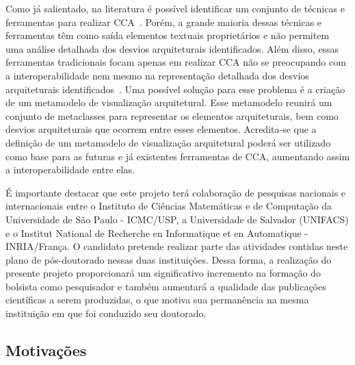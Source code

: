 \documentclass[12pt]{article}
\begin{document}
Como já salientado, na literatura é possível identificar um conjunto de técnicas e ferramentas para realizar CCA~\cite{Maffort_2013, Knodel_2007, ArchJava_2202, Murphy_1995}. Porém, a grande maioria dessas técnicas e ferramentas têm como saída elementos textuais proprietários e não permitem uma análise detalhada dos desvios arquiteturais identificados. Além disso, essas ferramentas tradicionais focam apenas em realizar CCA não se preocupando com a interoperabilidade nem mesmo na representação detalhada dos desvios arquiteturais identificados~\cite{Diehl_2007, Gallagher_2008}. Uma possível solução para esse problema é a criação de um metamodelo de visualização arquitetural. Esse metamodelo reunirá um conjunto de metaclasses para representar os elementos arquiteturais, bem como desvios arquiteturais que ocorrem entre esses elementos. Acredita-se que a definição de um metamodelo de visualização arquitetural poderá ser utilizado como base para as futuras e já existentes ferramentas de CCA, aumentando assim a interoperabilidade entre elas. 

É importante destacar que este projeto terá colaboração de pesquisas nacionais e internacionais entre o Instituto de Ciências Matemáticas e de Computação da Universidade de São Paulo - ICMC/USP, a Universidade de Salvador (UNIFACS) e o Institut National de Recherche en Informatique et en Automatique - INRIA/França. O candidato pretende realizar parte das atividades contidas neste plano de pós-doutorado nessas duas instituições. Dessa forma, a realização do presente projeto proporcionará um significativo incremento na formação do bolsista como pesquisador e também aumentará a qualidade das publicações científicas a serem produzidas, o que motiva sua permanência na mesma instituição em que foi conduzido seu doutorado.


\subsection{Motivações}

\end{document}
